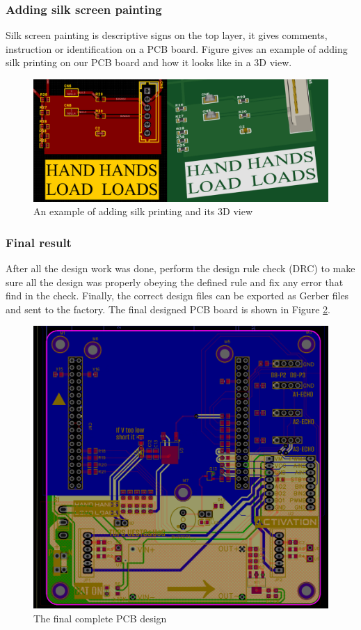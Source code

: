 \documentclass[12pt, a4paper, oneside]{report}
\begin{document}
\subsubsection{Adding silk screen painting}
Silk screen painting is descriptive signs on the top layer, it gives comments, instruction or identification on a PCB board. Figure \label{fig:pcb11} gives an example of adding silk printing on our PCB board and how it looks like in a 3D view.
\begin{figure}[!h]
	\centering
	\includegraphics[scale=0.25]{pic/PCB_figure/11_PCB.png}
	\caption{An example of adding silk printing and its 3D view}
    \label{fig:pcb11}
\end{figure}
\subsubsection{Final result}
After all the design work was done, perform the design rule check (DRC) to make sure all the design was properly obeying the defined rule and fix any error that find in the check. Finally, the correct design files can be exported as Gerber files and sent to the factory. The final designed PCB board is shown in Figure \ref{fig:pcb12}.
\begin{figure}[!h]
	\centering
	\includegraphics[scale=0.3]{pic/PCB_figure/12_PCB.png}
	\caption{The final complete PCB design}
    \label{fig:pcb12}
\end{figure}
\end{document}

